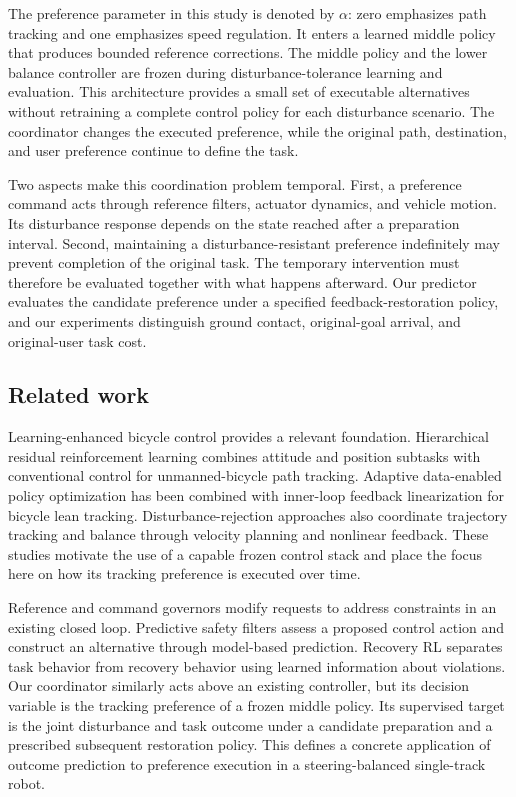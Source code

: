 \documentclass[journal]{IEEEtran}
\begin{document}
The preference parameter in this study is denoted by $\alpha$: zero emphasizes path tracking and one emphasizes speed regulation. It enters a learned middle policy that produces bounded reference corrections. The middle policy and the lower balance controller are frozen during disturbance-tolerance learning and evaluation. This architecture provides a small set of executable alternatives without retraining a complete control policy for each disturbance scenario. The coordinator changes the executed preference, while the original path, destination, and user preference continue to define the task.


Two aspects make this coordination problem temporal. First, a preference command acts through reference filters, actuator dynamics, and vehicle motion. Its disturbance response depends on the state reached after a preparation interval. Second, maintaining a disturbance-resistant preference indefinitely may prevent completion of the original task. The temporary intervention must therefore be evaluated together with what happens afterward. Our predictor evaluates the candidate preference under a specified feedback-restoration policy, and our experiments distinguish ground contact, original-goal arrival, and original-user task cost.


\subsection{Related work}

Learning-enhanced bicycle control provides a relevant foundation. Hierarchical residual reinforcement learning combines attitude and position subtasks with conventional control for unmanned-bicycle path tracking. \cite{R3} Adaptive data-enabled policy optimization has been combined with inner-loop feedback linearization for bicycle lean tracking. \cite{R4} Disturbance-rejection approaches also coordinate trajectory tracking and balance through velocity planning and nonlinear feedback. \cite{R5} These studies motivate the use of a capable frozen control stack and place the focus here on how its tracking preference is executed over time.


Reference and command governors modify requests to address constraints in an existing closed loop. \cite{R6} Predictive safety filters assess a proposed control action and construct an alternative through model-based prediction. \cite{R7} Recovery RL separates task behavior from recovery behavior using learned information about violations. \cite{R8} Our coordinator similarly acts above an existing controller, but its decision variable is the tracking preference of a frozen middle policy. Its supervised target is the joint disturbance and task outcome under a candidate preparation and a prescribed subsequent restoration policy. This defines a concrete application of outcome prediction to preference execution in a steering-balanced single-track robot.
\end{document}
